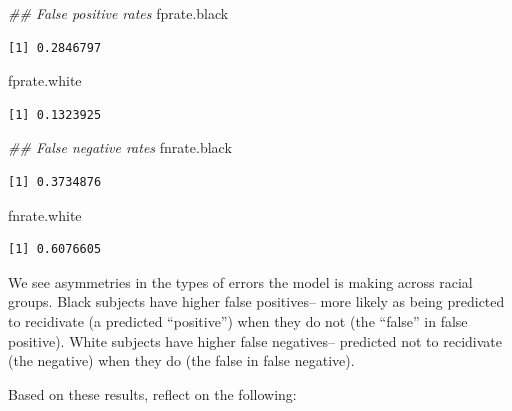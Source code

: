 \documentclass[
  letterpaper,
  DIV=11,
  numbers=noendperiod]{scrreprt}
\newenvironment{Shaded}{\begin{snugshade}}{\end{snugshade}}
\newcommand{\DocumentationTok}[1]{\textcolor[rgb]{0.37,0.37,0.37}{\textit{#1}}}
\newcommand{\NormalTok}[1]{\textcolor[rgb]{0.00,0.23,0.31}{#1}}
\begin{document}
\begin{Shaded}
\begin{Highlighting}[]
\DocumentationTok{\#\# False positive rates}
\NormalTok{fprate.black}
\end{Highlighting}
\end{Shaded}

\begin{verbatim}
[1] 0.2846797
\end{verbatim}

\begin{Shaded}
\begin{Highlighting}[]
\NormalTok{fprate.white }
\end{Highlighting}
\end{Shaded}

\begin{verbatim}
[1] 0.1323925
\end{verbatim}

\begin{Shaded}
\begin{Highlighting}[]
\DocumentationTok{\#\# False negative rates}
\NormalTok{fnrate.black}
\end{Highlighting}
\end{Shaded}

\begin{verbatim}
[1] 0.3734876
\end{verbatim}

\begin{Shaded}
\begin{Highlighting}[]
\NormalTok{fnrate.white }
\end{Highlighting}
\end{Shaded}

\begin{verbatim}
[1] 0.6076605
\end{verbatim}

We see asymmetries in the types of errors the model is making across
racial groups. Black subjects have higher false positives-- more likely
as being predicted to recidivate (a predicted ``positive'') when they do
not (the ``false'' in false positive). White subjects have higher false
negatives-- predicted not to recidivate (the negative) when they do (the
false in false negative).

Based on these results, reflect on the following:
\end{document}
